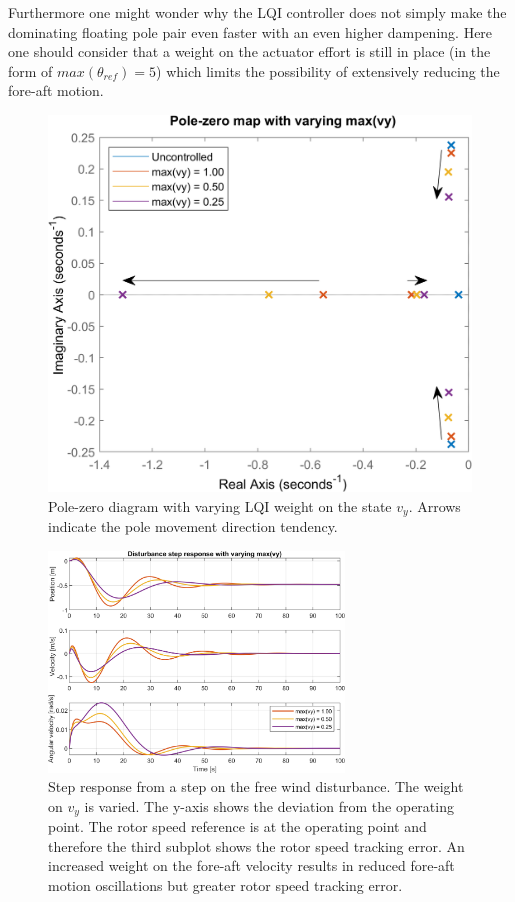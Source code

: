 Furthermore one might wonder why the LQI controller does not simply make the dominating floating pole pair even faster with an even higher dampening. Here one should consider that a weight on the actuator effort is still in place (in the form of $ max(\theta_{ref}) = 5 $) which limits the possibility of extensively reducing the fore-aft motion.
\begin{figure}[ht]
	\centering
	\includegraphics[width=.55\textwidth]{Graphics/LQI pole zero/02_pzmap_vy}
	\caption{Pole-zero diagram with varying LQI weight on the state $ v_y $. Arrows indicate the pole movement direction tendency.}
	\label{fig:pzmap_vy}
\end{figure}
\begin{figure}[ht]
	\centering
	\includegraphics[width=0.7\textwidth]{Graphics/LQI pole zero/102_step_vy.png}
	\caption{Step response from a step on the free wind disturbance. The weight on $ v_y $ is varied. The y-axis shows the deviation from the operating point. The rotor speed reference is at the operating point and therefore the third subplot shows the rotor speed tracking error. An increased weight on the fore-aft velocity results in reduced fore-aft motion oscillations but greater rotor speed tracking error.}
	\label{fig:step_vy}
\end{figure}


